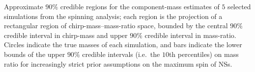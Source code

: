 \label{fig:comp_masses} Approximate $90\%$ credible regions for the component-mass estimates of $5$ selected simulations from the spinning analysis; each region is the projection of a rectangular region of chirp-mass--mass-ratio space, bounded by the central $90\%$ credible interval in chirp-mass and upper $90\%$ credible interval in mass-ratio. Circles indicate the true masses of each simulation, and bars indicate the lower bounds of the upper $90\%$ credible intervals (i.e.\ the $10$th percentiles) on mass ratio for increasingly strict prior assumptions on the maximum spin of NSs.